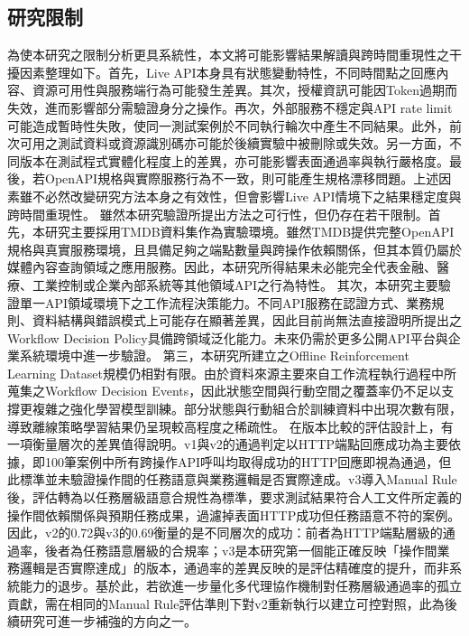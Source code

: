 \begin{ZhChapter}
\subsection{研究限制}
\text 為使本研究之限制分析更具系統性，本文將可能影響結果解讀與跨時間重現性之干擾因素整理如下。首先，Live API本身具有狀態變動特性，不同時間點之回應內容、資源可用性與服務端行為可能發生差異。其次，授權資訊可能因Token過期而失效，進而影響部分需驗證身分之操作。再次，外部服務不穩定與API rate limit可能造成暫時性失敗，使同一測試案例於不同執行輪次中產生不同結果。此外，前次可用之測試資料或資源識別碼亦可能於後續實驗中被刪除或失效。另一方面，不同版本在測試程式實體化程度上的差異，亦可能影響表面通過率與執行嚴格度。最後，若OpenAPI規格與實際服務行為不一致，則可能產生規格漂移問題。上述因素雖不必然改變研究方法本身之有效性，但會影響Live API情境下之結果穩定度與跨時間重現性。
\text 雖然本研究驗證所提出方法之可行性，但仍存在若干限制。首先，本研究主要採用TMDB資料集作為實驗環境。雖然TMDB提供完整OpenAPI規格與真實服務環境，且具備足夠之端點數量與跨操作依賴關係，但其本質仍屬於媒體內容查詢領域之應用服務。因此，本研究所得結果未必能完全代表金融、醫療、工業控制或企業內部系統等其他領域API之行為特性。
\text 其次，本研究主要驗證單一API領域環境下之工作流程決策能力。不同API服務在認證方式、業務規則、資料結構與錯誤模式上可能存在顯著差異，因此目前尚無法直接證明所提出之Workflow Decision Policy具備跨領域泛化能力。未來仍需於更多公開API平台與企業系統環境中進一步驗證。
\text 第三，本研究所建立之Offline Reinforcement Learning Dataset規模仍相對有限。由於資料來源主要來自工作流程執行過程中所蒐集之Workflow Decision Events，因此狀態空間與行動空間之覆蓋率仍不足以支撐更複雜之強化學習模型訓練。部分狀態與行動組合於訓練資料中出現次數有限，導致離線策略學習結果仍呈現較高程度之稀疏性。
\text 在版本比較的評估設計上，有一項衡量層次的差異值得說明。v1與v2的通過判定以HTTP端點回應成功為主要依據，即100筆案例中所有跨操作API呼叫均取得成功的HTTP回應即視為通過，但此標準並未驗證操作間的任務語意與業務邏輯是否實際達成。v3導入Manual Rule後，評估轉為以任務層級語意合規性為標準，要求測試結果符合人工文件所定義的操作間依賴關係與預期任務成果，過濾掉表面HTTP成功但任務語意不符的案例。因此，v2的0.72與v3的0.69衡量的是不同層次的成功：前者為HTTP端點層級的通過率，後者為任務語意層級的合規率；v3是本研究第一個能正確反映「操作間業務邏輯是否實際達成」的版本，通過率的差異反映的是評估精確度的提升，而非系統能力的退步。基於此，若欲進一步量化多代理協作機制對任務層級通過率的孤立貢獻，需在相同的Manual Rule評估準則下對v2重新執行以建立可控對照，此為後續研究可進一步補強的方向之一。


\end{ZhChapter}
